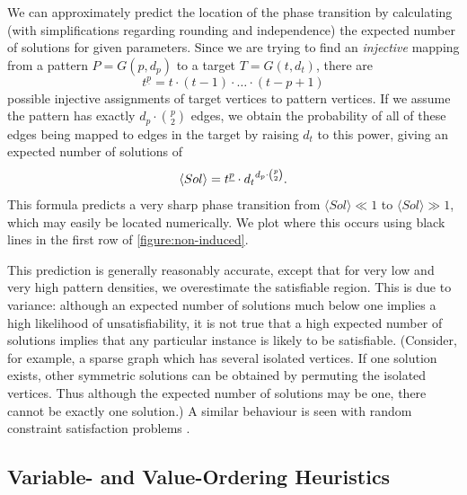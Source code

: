 \documentclass[twoside,11pt]{article}
\newcommand{\citep}[1]{\cite{#1}}
\begin{document}
We can approximately predict the location of the phase transition by calculating (with
simplifications regarding rounding and independence) the expected number of solutions for given
parameters. Since we are trying to find an \emph{injective} mapping from a pattern $P = G(p, d_p)$
to a target $T = G(t, d_t)$, there are \[ t^{\underline{p}} = t \cdot (t - 1) \cdot \ldots \cdot (t
- p + 1) \] possible injective assignments of target vertices to pattern vertices.  If we assume the
pattern has exactly $d_p \cdot \binom{p}{2}$ edges, we obtain the probability of all of these edges
being mapped to edges in the target by raising $d_t$ to this power, giving an expected number of
solutions of \begin{equation}\label{equation:non-induced-prediction} \langle Sol \rangle =
t^{\underline{p}} \cdot {d_t}^{d_p \cdot \binom{p}{2}} \textnormal{.} \end{equation} This formula
predicts a very sharp phase transition from $\langle Sol \rangle \ll 1$ to $\langle Sol \rangle \gg
1$, which may easily be located numerically. We plot where this occurs using black lines in the
first row of \cref{figure:non-induced}.

This prediction is generally reasonably accurate, except that for very low and very high pattern
densities, we overestimate the satisfiable region. This is due to variance: although an expected
number of solutions much below one implies a high likelihood of unsatisfiability, it is not true
that a high expected number of solutions implies that any particular instance is likely to be
satisfiable. (Consider, for example, a sparse graph which has several isolated vertices. If one
solution exists, other symmetric solutions can be obtained by permuting the isolated vertices.
Thus although the expected number of solutions may be one, there cannot be exactly one solution.) A
similar behaviour is seen with random constraint satisfaction problems
\citep{DBLP:journals/ai/SmithD96}.

\subsection{Variable- and Value-Ordering Heuristics}
\end{document}
